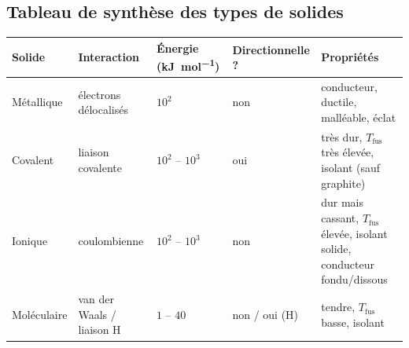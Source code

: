 \documentclass[11pt,a4paper]{article}
\begin{document}
\subsection*{Tableau de synthèse des types de solides}

\begin{center}
\small
\renewcommand{\arraystretch}{1.5}
\begin{tabular}{|>{\raggedright\arraybackslash}p{2cm}|>{\raggedright\arraybackslash}p{3cm}|>{\raggedright\arraybackslash}p{2.2cm}|>{\raggedright\arraybackslash}p{2.2cm}|>{\raggedright\arraybackslash}p{4.6cm}|}
\hline
\textbf{Solide} & \textbf{Interaction} & \textbf{Énergie (\si{\kilo\joule\per\mol})} & \textbf{Direction\-nelle ?} & \textbf{Propriétés} \\ \hline
Métallique & électrons délocalisés & $10^2$ & non & conducteur, ductile, malléable, éclat \\ \hline
Covalent & liaison covalente & $10^2$ -- $10^3$ & oui & très dur, $T_{\mathrm{fus}}$ très élevée, isolant (sauf graphite) \\ \hline
Ionique & coulombienne & $10^2$ -- $10^3$ & non & dur mais cassant, $T_{\mathrm{fus}}$ élevée, isolant solide, conducteur fondu/dissous \\ \hline
Moléculaire & van der Waals / liaison H & $1$ -- $40$ & non / oui (H) & tendre, $T_{\mathrm{fus}}$ basse, isolant \\ \hline
\end{tabular}
\end{center}
\end{document}
